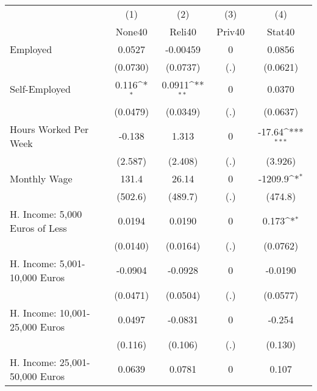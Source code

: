 {
\def\sym#1{\ifmmode^{#1}\else\(^{#1}\)\fi}
\begin{tabular}{l*{4}{c}}
\hline\hline
            &\multicolumn{1}{c}{(1)}&\multicolumn{1}{c}{(2)}&\multicolumn{1}{c}{(3)}&\multicolumn{1}{c}{(4)}\\
            &\multicolumn{1}{c}{None40}&\multicolumn{1}{c}{Reli40}&\multicolumn{1}{c}{Priv40}&\multicolumn{1}{c}{Stat40}\\
\hline
Employed    &      0.0527         &    -0.00459         &           0         &      0.0856         \\
            &    (0.0730)         &    (0.0737)         &         (.)         &    (0.0621)         \\
[1em]
Self-Employed&       0.116\sym{*}  &      0.0911\sym{**} &           0         &      0.0370         \\
            &    (0.0479)         &    (0.0349)         &         (.)         &    (0.0637)         \\
[1em]
Hours Worked Per Week&      -0.138         &       1.313         &           0         &      -17.64\sym{***}\\
            &     (2.587)         &     (2.408)         &         (.)         &     (3.926)         \\
[1em]
Monthly Wage&       131.4         &       26.14         &           0         &     -1209.9\sym{*}  \\
            &     (502.6)         &     (489.7)         &         (.)         &     (474.8)         \\
[1em]
H. Income: 5,000 Euros of Less&      0.0194         &      0.0190         &           0         &       0.173\sym{*}  \\
            &    (0.0140)         &    (0.0164)         &         (.)         &    (0.0762)         \\
[1em]
H. Income: 5,001-10,000 Euros&     -0.0904         &     -0.0928         &           0         &     -0.0190         \\
            &    (0.0471)         &    (0.0504)         &         (.)         &    (0.0577)         \\
[1em]
H. Income: 10,001-25,000 Euros&      0.0497         &     -0.0831         &           0         &      -0.254         \\
            &     (0.116)         &     (0.106)         &         (.)         &     (0.130)         \\
[1em]
H. Income: 25,001-50,000 Euros&      0.0639         &      0.0781         &           0         &       0.107         \\

\end{tabular}}
